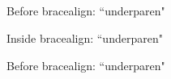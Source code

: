 \documentclass{article}
\begin{document}
\subsection{}

\begin{dispExample}
  Before \textsf{bracealign}:\newline
  ``\expandafter\meaning\csname underparen\endcsname"
  \par\bigskip
  \begin{bracealign}
    Inside \textsf{bracealign}:\newline
    ``\expandafter\meaning\csname underparen\endcsname"
  \end{bracealign}
  \par\bigskip
  Before \textsf{bracealign}:\newline
  ``\expandafter\meaning\csname underparen\endcsname"
\end{dispExample}
\end{document}
